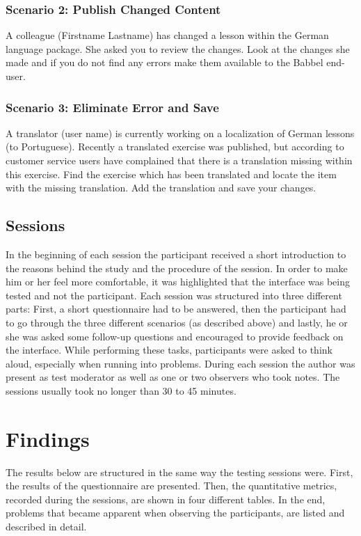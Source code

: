 \subsubsection{Scenario 2: Publish Changed Content}
A colleague (Firstname Lastname) has changed a lesson within the German language package. She asked you to review the changes. Look at the changes she made and if you do not find any errors make them available to the Babbel end-user.


\subsubsection{Scenario 3: Eliminate Error and Save}
A translator (user name) is currently working on a localization of German lessons (to Portuguese). Recently a translated exercise was published, but according to customer service users have complained that there is a translation missing within this exercise. Find the exercise which has been translated and locate the item with the missing translation. Add the translation and save your changes.

\subsection{Sessions}
In the beginning of each session the participant received a short introduction to the reasons behind the study and the procedure of the session. In order to make him or her feel more comfortable, it was highlighted that the interface was being tested and not the participant. Each session was structured into three different parts: First, a short questionnaire had to be answered, then the participant had to go through the three different scenarios (as described above) and lastly, he or she was asked some follow-up questions and encouraged to provide feedback on the interface. While performing these tasks, participants were asked to think aloud, especially when running into problems. During each session the author was present as test moderator as well as one or two observers who took notes. The sessions usually took no longer than 30 to 45 minutes.

\section{Findings}
The results below are structured in the same way the testing sessions were. First, the results of the questionnaire are presented. Then, the quantitative metrics, recorded during the sessions, are shown in four different tables. In the end, problems that became apparent when observing the participants, are listed and described in detail.

